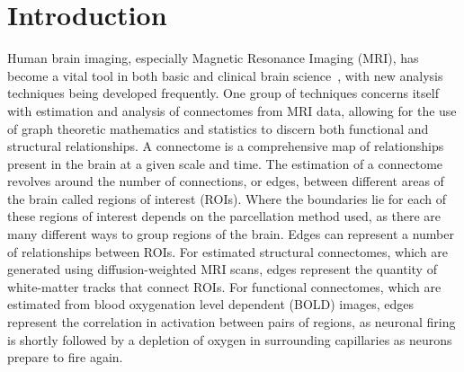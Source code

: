 \section{Introduction}
Human brain imaging, especially Magnetic Resonance Imaging (MRI), has become a vital tool in both basic and clinical brain science~\cite{mrivalue}, with new analysis techniques being developed frequently. One group of techniques concerns itself with estimation and analysis of connectomes from MRI data, allowing for the use of graph theoretic mathematics and statistics to discern both functional and structural relationships. A connectome is a comprehensive map of relationships present in the brain at a given scale and time. The estimation of a connectome revolves around the number of connections, or edges, between different areas of the brain called regions of interest (ROIs). Where the boundaries lie for each of these regions of interest depends on the parcellation method used, as there are many different ways to group regions of the brain. Edges can represent a number of relationships between ROIs. For estimated structural connectomes, which are generated using diffusion-weighted MRI scans, edges represent the quantity of white-matter tracks that connect ROIs. For functional connectomes, which are estimated from blood oxygenation level dependent (BOLD) images, edges represent the correlation in activation between pairs of regions, as neuronal firing is shortly followed by a depletion of oxygen in surrounding capillaries as neurons prepare to fire again.

